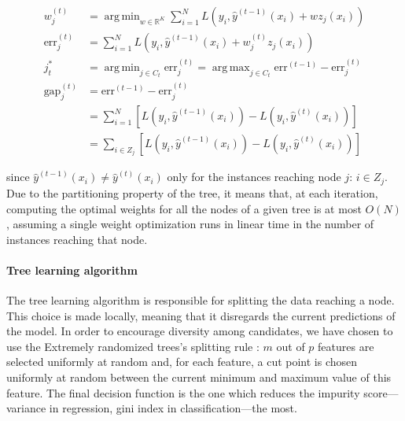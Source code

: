 \documentclass{article}
\DeclareMathOperator*{\argmin}{arg\,min}
\DeclareMathOperator*{\argmax}{arg\,max}
\begin{document}
\begin{align}\label{eq:nodeSel}
w_j^{(t)} &= \argmin_{w \in \mathbb{R}^K} \sum_{i=1}^{N} L \left(y_i, 
\hat{y}^{(t-1)}(x_i) + w z_j(x_i)  \right) \\
\text{err}_j^{(t)} &= \sum_{i=1}^{N} L \left(y_i, \hat{y}^{(t-1)}(x_i) + 
w_j^{(t)} z_j(x_i)  \right) \\
j_t^* &= \argmin_{j \in C_t} \text{err}_j^{(t)} = \argmax_{j \in C_t} 
\text{err}^{(t-1)} - \text{err}_j^{(t)} \\
\text{gap}_j^{(t)} &= \text{err}^{(t-1)} - \text{err}_j^{(t)} \\
&= \sum_{i=1}^{N} \left[ L\left(y_i, \hat{y}^{(t-1)}(x_i)\right) - L\left(y_i, 
\hat{y}^{(t)}(x_i)\right) \right] \\
&= \sum_{i\in Z_j} \left[ L\left(y_i, \hat{y}^{(t-1)}(x_i)\right) - L\left(y_i, 
\hat{y}^{(t)}(x_i)\right) \right]
\end{align}

since $\hat{y}^{(t-1)}(x_i) \neq \hat{y}^{(t)}(x_i)$ only for the instances 
reaching node $j$: $i \in Z_j$. Due to the partitioning property of the tree, 
it means that, at each iteration, computing the optimal weights for all the 
nodes of a given tree is at most $O(N)$, assuming a single weight optimization 
runs in linear time in the number of instances reaching that node.

\paragraph{Tree learning algorithm}
The tree learning algorithm is responsible for splitting the data reaching a 
node. This choice is made locally, meaning that it disregards the current 
predictions of the model. In order to encourage diversity among candidates, we 
have chosen to use the Extremely randomized trees's splitting rule 
\cite{extratrees}: $m$ out of $p$ features are selected uniformly at random 
and, for each feature, a cut point is chosen uniformly at random between the 
current minimum and maximum value of this feature. The final decision function 
is the one which reduces the impurity score---variance in regression, gini 
index in classification---the most.
\end{document}
